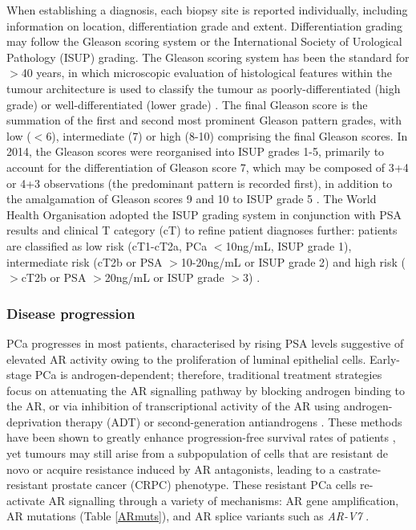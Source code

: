     \par
When establishing a diagnosis, each biopsy site is reported individually, including information on location, differentiation grade and extent. Differentiation grading may follow the Gleason scoring system or the International Society of Urological Pathology (ISUP) grading. The Gleason scoring system has been the standard for $>$40 years, in which microscopic evaluation of histological features within the tumour architecture is used to classify the tumour as poorly-differentiated (high grade) or well-differentiated (lower grade) \cite{Gleason1974Jan, Kweldam2019Jan}. The final Gleason score is the summation of the first and second most prominent Gleason pattern grades, with low ($<$6), intermediate (7) or high (8-10) comprising the final Gleason scores. In 2014, the Gleason scores were reorganised into ISUP grades 1-5, primarily to account for the differentiation of Gleason score 7, which may be composed of 3+4 or 4+3 observations (the predominant pattern is recorded first), in addition to the amalgamation of Gleason scores 9 and 10 to ISUP grade 5 \cite{Epstein2015Jul}. The World Health Organisation adopted the ISUP grading system in conjunction with PSA results and clinical T category (cT) to refine patient diagnoses further: patients are classified as low risk (cT1-cT2a, PCa $<$10ng/mL, ISUP grade 1), intermediate risk (cT2b or PSA $>$10-20ng/mL or ISUP grade 2) and high risk ($>$cT2b or PSA $>$20ng/mL or ISUP grade $>$3) \cite{Mottet2017Apr}.

\subsubsection{Disease progression}
PCa progresses in most patients, characterised by rising PSA levels suggestive of elevated AR activity owing to the proliferation of luminal epithelial cells. Early-stage PCa is androgen-dependent; therefore, traditional treatment strategies focus on attenuating the AR signalling pathway by blocking androgen binding to the AR, or via inhibition of transcriptional activity of the AR using androgen-deprivation therapy (ADT) or second-generation antiandrogens \cite{Li2025Feb}. These methods have been shown to greatly enhance progression-free survival rates of patients \cite{Fizazi2017Jul}, yet tumours may still arise from a subpopulation of cells that are resistant de novo or acquire resistance induced by AR antagonists, leading to a castrate-resistant prostate cancer (CRPC) phenotype. These resistant PCa cells re-activate AR signalling through a variety of mechanisms: AR gene amplification, AR mutations (Table \ref{ARmuts}), and AR splice variants such as \textit{AR-V7} \cite{Csizmarik2021Oct}. \par

